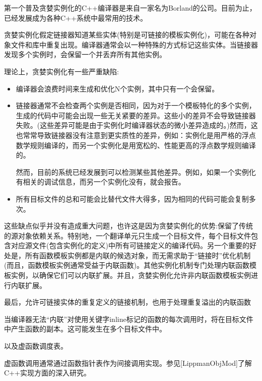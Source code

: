 第一个普及贪婪实例化的C++编译器是来自一家名为Borland的公司。目前为止，已经发展成为各种C++系统中最常用的技术。

贪婪实例化假定链接器知道某些实体(特别是可链接的模板实例化)，可能在各种对象文件和库中重复出现。编译器通常会以一种特殊的方式标记这些实体。当链接器发现多个实例时，会保留一个并丢弃所有其他实例。

理论上，贪婪实例化有一些严重缺陷:

\begin{itemize}
\item 
编译器会浪费时间来生成和优化N个实例，其中只有一个会保留。

\item 
链接器通常不会检查两个实例是否相同，因为对于一个模板特化的多个实例，生成的代码中可能会出现一些无关紧要的差异。这些小的差异不会导致链接器失败。(这些差异可能是由于实例化时编译器状态的微小差异造成的。)然而，这也常常导致链接器没有注意到更实质性的差异，例如：实例化是用严格的浮点数学规则编译的，而另一个实例化是用宽松的、性能更高的浮点数学规则编译的。

\begin{notice}然而，目前的系统已经发展到可以检测某些其他差异。例如，如果一个实例化有相关的调试信息，而另一个实例化没有，就会报告。
\end{notice}

\item 
所有目标文件的总和可能会比替代文件大得多，因为相同的代码可能会复制多次。
\end{itemize}

这些缺点似乎并没有造成重大问题，也许这是因为贪婪实例化的优势:保留了传统的源对象依赖关系。特别地，一个翻译单元只生成一个目标文件，每个目标文件包含对应源文件(包含实例化的定义)中所有可链接定义的编译代码。另一个重要的好处是，所有函数模板实例都是内联的候选对象，而无需求助于“链接时”优化机制(而且，函数模板实例通常受益于内联函数)。其他实例化机制专门处理内联函数模板实例，以确保它们可以内联扩展。并且，贪婪实例化允许非内联函数模板实例进行内联扩展。

最后，允许可链接实体的重复定义的链接机制，也用于处理重复溢出的内联函数

\begin{notice}当编译器无法“内联”对使用关键字inline标记的函数的每次调用时，将在目标文件中产生函数的副本。这可能发生在多个目标文件中。
\end{notice}

以及虚函数调度表。

\begin{notice}虚函数调用通常通过函数指针表作为间接调用实现。参见[LippmanObjMod]了解C++实现方面的深入研究。
\end{notice}

